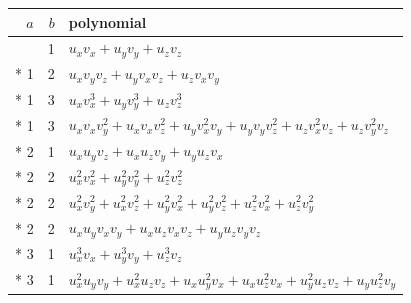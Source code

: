 \documentclass[10pt,a4paper]{article}
\numberwithin{equation}{section}
\begin{document}
{\small\renewcommand{\arraystretch}{1.2}\begin{longtable}{@{}rrl@{}}\toprule
$a$ & $b$ & polynomial\\\midrule\endhead
\bottomrule\endfoot\endlastfoot
1 & 1 & $u_{x}v_{x} + u_{y}v_{y} + u_{z}v_{z}$\\*
1 & 2 & $u_{x}v_{y}v_{z} + u_{y}v_{x}v_{z} + u_{z}v_{x}v_{y}$\\*
1 & 3 & $u_{x}v_{x}^{3} + u_{y}v_{y}^{3} + u_{z}v_{z}^{3}$\\*
1 & 3 & $u_{x}v_{x}v_{y}^{2} + u_{x}v_{x}v_{z}^{2} + u_{y}v_{x}^{2}v_{y} + u_{y}v_{y}v_{z}^{2} + u_{z}v_{x}^{2}v_{z} + u_{z}v_{y}^{2}v_{z}$\\*
2 & 1 & $u_{x}u_{y}v_{z} + u_{x}u_{z}v_{y} + u_{y}u_{z}v_{x}$\\*
2 & 2 & $u_{x}^{2}v_{x}^{2} + u_{y}^{2}v_{y}^{2} + u_{z}^{2}v_{z}^{2}$\\*
2 & 2 & $u_{x}^{2}v_{y}^{2} + u_{x}^{2}v_{z}^{2} + u_{y}^{2}v_{x}^{2} + u_{y}^{2}v_{z}^{2} + u_{z}^{2}v_{x}^{2} + u_{z}^{2}v_{y}^{2}$\\*
2 & 2 & $u_{x}u_{y}v_{x}v_{y} + u_{x}u_{z}v_{x}v_{z} + u_{y}u_{z}v_{y}v_{z}$\\*
3 & 1 & $u_{x}^{3}v_{x} + u_{y}^{3}v_{y} + u_{z}^{3}v_{z}$\\*
3 & 1 & $u_{x}^{2}u_{y}v_{y} + u_{x}^{2}u_{z}v_{z} + u_{x}u_{y}^{2}v_{x} + u_{x}u_{z}^{2}v_{x} + u_{y}^{2}u_{z}v_{z} + u_{y}u_{z}^{2}v_{y}$\\
\bottomrule\end{longtable}}
\end{document}
